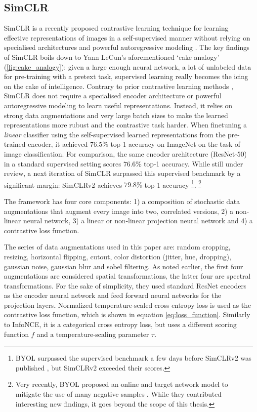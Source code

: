 \subsection{SimCLR}
SimCLR is a recently proposed contrastive learning technique for learning effective representations of images in a self-supervised manner without relying on specialised architectures and powerful autoregressive modeling \cite{chen_simple_2020}.
The key findings of SimCLR boils down to Yann LeCun's aforementioned `cake analogy' (\ref{fig:cake_analogy}): given a large enough neural network, a lot of unlabeled data for pre-training with a pretext task, supervised learning really becomes the icing on the cake of intelligence.
Contrary to prior contrastive learning methods \cite{oord_representation_2019,henaff2019data,hjelm_learning_2019}, SimCLR does not require a specialised encoder architecture or powerful autoregressive modeling to learn useful representations. Instead, it relies on strong data augmentations and very large batch sizes to make the learned representations more rubust and the contrastive task harder.
When finetuning a \textit{linear} classifier using the self-supervised learned representations from the pre-trained encoder, it achieved $76.5\%$ top-1 accuracy on ImageNet on the task of image classification.
For comparison, the same encoder architecture (ResNet-50) in a standard supervised setting scores $76.6\%$ top-1 accuracy.
While still under review, a next iteration of SimCLR surpassed this supervised benchmark by a significant margin: SimCLRv2 achieves $79.8\%$ top-1 accuracy \cite{chen2020big}\footnote{BYOL surpassed the supervised benchmark a few days before SimCLRv2 was published \cite{Grill2020BootstrapYO}, but SimCLRv2 exceeded their scores.}.
\footnote{Very recently, BYOL proposed an online and target network model to mitigate the use of many negative samples \cite{Grill2020BootstrapYO}.
While they contributed interesting new findings, it goes beyond the scope of this thesis.}

The framework has four core components: 1) a composition of stochastic data augmentations that augment every image into two, correlated versions, 2) a non-linear neural network, 3) a linear or non-linear projection neural network and 4) a contrastive loss function.

The series of data augmentations used in this paper are: random cropping, resizing, horizontal flipping, cutout, color distortion (jitter, hue, dropping), gaussian noise, gaussian blur and sobel filtering. As noted earlier, the first four augmentations are considered spatial transformations, the latter four are spectral transformations.
For the sake of simplicity, they used standard ResNet encoders as the encoder neural network and feed forward neural networks for the projection layers.
Normalized temperature-scaled cross entropy loss is used as the contrastive loss function, which is shown in equation \ref{eq:loss_function}. Similarly to InfoNCE, it is a categorical cross entropy loss, but uses a different scoring function $f$ and a temperature-scaling parameter $\tau$.


